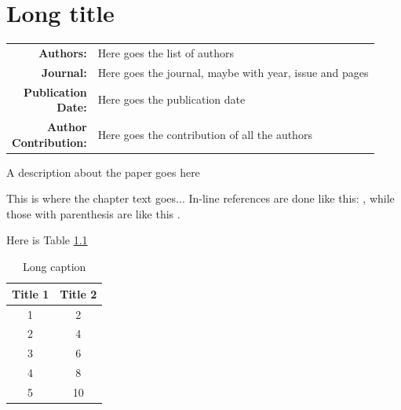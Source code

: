 \documentclass[../main.tex]{subfiles}
\begin{document}
\chapter[Short title]{Long title}
\label{cha:label} %

{\renewcommand{\arraystretch}{2.0} %
	\begin{table}[h]
		\begin{tabularx}{\textwidth}{>{\bfseries}r X}

			Authors: & Here goes the list of authors \\
			Journal: & Here goes the journal, maybe with year, issue and pages \\
			\makecell[tr]{Publication \\ Date:} & Here goes the publication date \\
			\makecell[tr]{Author \\ Contribution:} & Here goes the contribution of all the authors \\

		\end{tabularx}
	\end{table}
}

A description about the paper goes here

\clearpage %

This is where the chapter text goes... In-line references are done like this: \citet{Horvath2011}, while those with parenthesis are like this \citep{Horvath2011}.

Here is Table \ref{ch2:tab:table1}

\begin{table}[t]

    \caption[Short caption]{Long caption}

    \label{ch2:tab:table1}

    \begin{tabular}{c c}

        \hline

         Title 1 & Title 2  \\

         \hline

         1       & 2        \\
         2       & 4        \\
         3       & 6        \\
         4       & 8        \\
         5       & 10       \\

         \hline


    \end{tabular}

\end{table}
\end{document}
